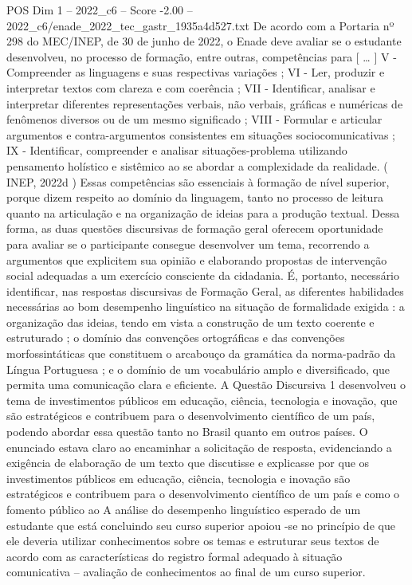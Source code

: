 \begin{textsample}{POS Dim 1 – 2022\_c6 – Score -2.00 – 2022\_c6/enade\_2022\_tec\_gastr\_1935a4d527.txt}
De acordo com a Portaria nº 298 do MEC/INEP, de 30 de junho de 2022, o Enade deve avaliar se o estudante desenvolveu, no processo de formação, entre outras, competências para [ … ] V - Compreender as linguagens e suas respectivas variações ; VI - Ler, produzir e interpretar textos com clareza e com coerência ; VII - Identificar, analisar e interpretar diferentes representações verbais, não verbais, gráficas e numéricas de fenômenos diversos ou de um mesmo significado ; VIII - Formular e articular argumentos e contra-argumentos consistentes em situações sociocomunicativas ; IX - Identificar, compreender e analisar situações-problema utilizando pensamento holístico e sistêmico ao se abordar a complexidade da realidade. ( INEP, 2022d ) Essas competências são essenciais à formação de nível superior, porque dizem respeito ao domínio da linguagem, tanto no processo de leitura quanto na articulação e na organização de ideias para a produção textual.
Dessa forma, as duas questões discursivas de formação geral oferecem oportunidade para avaliar se o participante consegue desenvolver um tema, recorrendo a argumentos que explicitem sua opinião e elaborando propostas de intervenção social adequadas a um exercício consciente da cidadania.
É, portanto, necessário identificar, nas respostas discursivas de Formação Geral, as diferentes habilidades necessárias ao bom desempenho linguístico na situação de formalidade exigida : a organização das ideias, tendo em vista a construção de um texto coerente e estruturado ; o domínio das convenções ortográficas e das convenções morfossintáticas que constituem o arcabouço da gramática da norma-padrão da Língua Portuguesa ; e o domínio de um vocabulário amplo e diversificado, que permita uma comunicação clara e eficiente.
A Questão Discursiva 1 desenvolveu o tema de investimentos públicos em educação, ciência, tecnologia e inovação, que são estratégicos e contribuem para o desenvolvimento científico de um país, podendo abordar essa questão tanto no Brasil quanto em outros países.
O enunciado estava claro ao encaminhar a solicitação de resposta, evidenciando a exigência de elaboração de um texto que discutisse e explicasse por que os investimentos públicos em educação, ciência, tecnologia e inovação são estratégicos e contribuem para o desenvolvimento científico de um país e como o fomento público ao A análise do desempenho linguístico esperado de um estudante que está concluindo seu curso superior apoiou -se no princípio de que ele deveria utilizar conhecimentos sobre os temas e estruturar seus textos de acordo com as características do registro formal adequado à situação comunicativa – avaliação de conhecimentos ao final de um curso superior.

\end{textsample}
